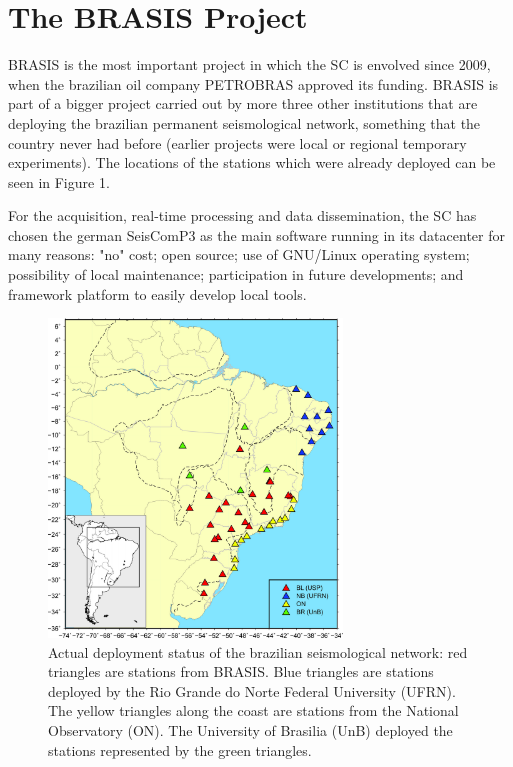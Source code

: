 \documentclass[twoside,letterpaper,twocolumn]{article}
\begin{document}
\section{The BRASIS Project}

BRASIS is the most important project in which the SC is envolved since 2009, when the brazilian oil company PETROBRAS approved its funding. BRASIS is part of a bigger project carried out by more three other institutions that are deploying the brazilian permanent seismological network, something that the country never had before (earlier projects were local or regional temporary experiments). The locations of the stations which were already deployed can be seen in Figure 1. 

For the acquisition, real-time processing and data dissemination, the SC has chosen the german SeisComP3 as the main software running in its datacenter for many reasons: "no" cost; open source; use of GNU/Linux operating system; possibility of local maintenance; participation in future developments; and framework platform to easily develop local tools.

\begin{figure}[h!]
\centering
\includegraphics[width=7.8cm]{images/rsb.jpg}
\caption[Figure 1]{Actual deployment status of the brazilian seismological network: red triangles are stations from BRASIS. Blue triangles are stations deployed by the Rio Grande do Norte Federal University (UFRN). The yellow triangles along the coast are stations from the National Observatory (ON). The University of Brasilia (UnB) deployed the stations represented by the green triangles. }
\end{figure}
\end{document}
